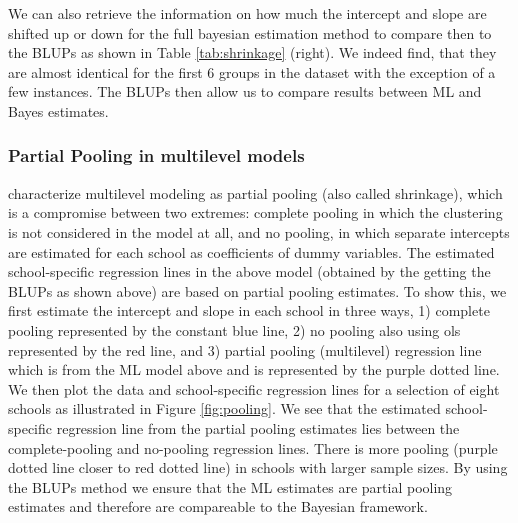 We can also retrieve the information on how much the intercept and slope are shifted up or down for the full bayesian estimation method to compare then to the BLUPs as shown in Table \ref{tab:shrinkage} (right). We indeed find, that they are almost identical for the first 6 groups in the dataset with the exception of a few instances. The BLUPs then allow us to compare results between ML and Bayes estimates. 

\subsubsection*{Partial Pooling in multilevel models}
\cite{gelman2006data} characterize multilevel modeling as partial pooling (also called shrinkage), which is a compromise between two extremes: complete pooling in which the clustering is not considered in the model at all, and no pooling, in which separate intercepts are estimated for each school as coefficients of dummy variables. The estimated school-specific regression lines in the above model (obtained by the getting the BLUPs as shown above) are based on partial pooling estimates. To show this, we first estimate the intercept and slope in each school in three ways, 1) complete pooling represented by the constant blue line, 2) no pooling also using ols represented by the red line, and 3) partial pooling (multilevel) regression line which is from the ML model above and is represented by the purple dotted line. We then plot the data and school-specific regression lines for a selection of eight schools as illustrated in Figure \ref{fig:pooling}. We see that the estimated school-specific regression line from the partial pooling estimates lies between the complete-pooling and no-pooling regression lines. There is more pooling (purple dotted line closer to red dotted line) in schools with larger sample sizes. By using the BLUPs method we ensure that the ML estimates are partial pooling estimates and therefore are compareable to the Bayesian framework.

